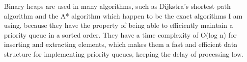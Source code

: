 \begin{FlushLeft}
    Binary heaps are used in many algorithms, such as Dijkstra's shortest path algorithm and the A* algorithm which happen to be the exact algorithms I am using, because they have the property of being able to efficiently maintain a priority queue in a sorted order. They have a time complexity of O(log n) for inserting and extracting elements, which makes them a fast and efficient data structure for implementing priority queues, keeping the delay of processing low.\\ \bk

    \bk








\end{FlushLeft}